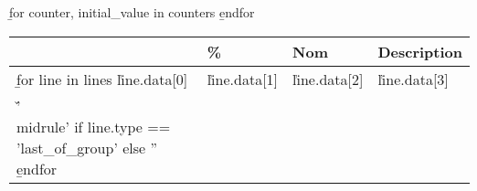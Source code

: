 \b{for counter, initial_value in counters}
\b{endfor}

\small

\renewcommand\arraystretch{1.2}

\begin{spacing}{.9}
\setlength\LTleft{-.5in}
\setlength\LTright{-.5in}
\begin{tabularx}{1.15\linewidth}{@{}p{1.5cm} | p{0.8cm} | p{6cm} X@{}}
\toprule
& \textbf{\%} & \textbf{Nom} & \textbf{Description}\\\midrule\endhead
\b{for line in lines}
\v{line.data[0]} & \v{line.data[1]} & \v{line.data[2]} & \v{line.data[3]}\\\v{'\\midrule' if line.type == 'last_of_group' else ''}
\b{endfor}\bottomrule
\end{tabularx}
\end{spacing}
